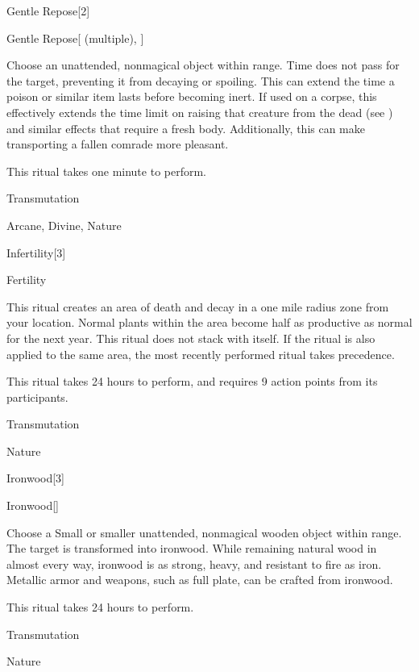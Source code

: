 \begin{spellsection}{Gentle Repose}[2]


\begin{ability}{Gentle Repose}[ (multiple), ]

Choose an unattended, nonmagical object within \rngclose range.
Time does not pass for the target, preventing it from decaying or spoiling.
This can extend the time a poison or similar item lasts before becoming inert.
If used on a corpse, this effectively extends the time limit on raising that creature from the dead (see ) and similar effects that require a fresh body.
Additionally, this can make transporting a fallen comrade more pleasant.

This ritual takes one minute to perform.

\end{ability}




 Transmutation

 Arcane, Divine, Nature
\end{spellsection}


\begin{spellsection}{Infertility}[3]


\begin{ability}{Fertility}

This ritual creates an area of death and decay in a one mile radius zone from your location.
Normal plants within the area become half as productive as normal for the next year.
This ritual does not stack with itself.
If the  ritual is also applied to the same area, the most recently performed ritual takes precedence.

This ritual takes 24 hours to perform, and requires 9 action points from its participants.

\end{ability}




 Transmutation

 Nature
\end{spellsection}


\begin{spellsection}{Ironwood}[3]


\begin{ability}{Ironwood}[]

Choose a Small or smaller unattended, nonmagical wooden object within \rngclose range.
The target is transformed into ironwood.
While remaining natural wood in almost every way, ironwood is as strong, heavy, and resistant to fire as iron.
Metallic armor and weapons, such as full plate, can be crafted from ironwood.

This ritual takes 24 hours to perform.

\end{ability}




 Transmutation

 Nature
\end{spellsection}


